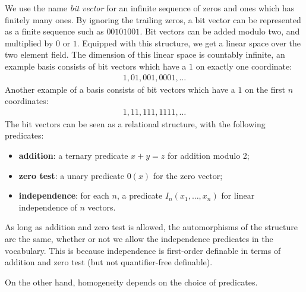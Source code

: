We use the name \emph{bit vector} for an infinite sequence of zeros and ones which has finitely many ones. By ignoring the trailing zeros, a bit vector can be represented as a finite sequence such as $00101001$. Bit vectors can be added modulo two, and multiplied by $0$ or $1$. Equipped with this structure, we get a linear space over the two element field. The dimension of this linear space is countably infinite, an example basis consists of bit vectors which have a $1$ on exactly one coordinate:
\begin{align*}
	1, 01,001,0001,\ldots
\end{align*}
Another example of a basis consists of bit vectors which have a $1$ on the first $n$ coordinates:
\begin{align*}
	1,11,111,1111,\ldots
\end{align*}
The bit vectors can be seen as a relational structure, with the following predicates:
\begin{itemize}
	\item {\bf addition}: a ternary predicate $x + y = z$ for addition modulo 2;
	\item {\bf zero test}: a unary predicate $0(x)$ for the zero vector; 
	\item {\bf independence}: for each $n$, a predicate $I_n(x_1,\ldots,x_n)$ for linear independence of $n$ vectors.
\end{itemize}

As long as addition and zero test is allowed, the automorphisms of the structure are the same, whether or not we allow the independence predicates in the vocabulary. This is because independence is first-order definable in terms of addition and zero test (but not quantifier-free definable). %


On the other hand, homogeneity depends on the choice of predicates.






